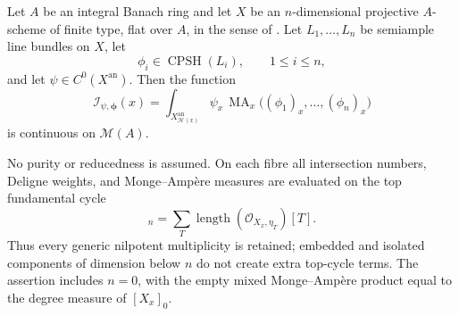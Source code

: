 \begin{theorem}
\label{thm:p171-full-assembly}
Let \(A\) be an integral Banach ring and let \(X\) be an
\(n\)-dimensional projective \(A\)-scheme of finite type, flat over
\(A\), in the sense of
\cite[Definition~4.8 and Question~4.9]{PS23Hybrid}.  Let
\(L_1,\ldots,L_n\) be semiample line bundles on
\(X\), let
\[
 \phi_i\in\operatorname{CPSH}(L_i),\qquad 1\leq i\leq n,
\]
and let \(\psi\in C^0(X^{\mathrm{an}})\).  Then the function
\begin{equation}
 \mathcal I_{\psi,\boldsymbol\phi}(x)
 =\int_{X_{\mathcal H(x)}^{\mathrm{an}}}
       \psi_x\,
       \operatorname{MA}_x
       \bigl((\phi_1)_x,\ldots,(\phi_n)_x\bigr)
 \label{eq:p171-full-target}
\end{equation}
is continuous on \(\mathcal M(A)\).

No purity or reducedness is assumed.  On each fibre all intersection
numbers, Deligne weights, and Monge--Amp\`ere measures are evaluated on
the top fundamental cycle
\begin{equation}
 [X_x]_n=\sum_T
 \operatorname{length}(\mathcal O_{X_x,\eta_T})[T].
 \label{eq:p171-full-fundamental-cycle}
\end{equation}
Thus every generic nilpotent multiplicity is retained; embedded and
isolated components of dimension below \(n\) do not create extra
top-cycle terms.  The assertion includes \(n=0\), with the empty mixed
Monge--Amp\`ere product equal to the degree measure of
\([X_x]_0\).
\end{theorem}
